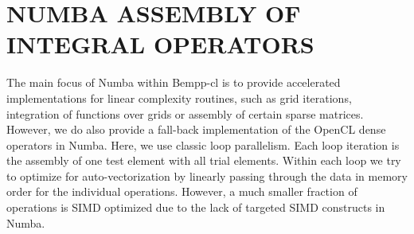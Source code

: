 \section{NUMBA ASSEMBLY OF INTEGRAL OPERATORS}

The main focus of Numba within Bempp-cl is to provide accelerated implementations for linear complexity routines, such as grid iterations, integration of functions over grids or assembly of certain sparse matrices. However, we do also provide a fall-back implementation of the OpenCL dense operators in Numba. Here, we use classic loop parallelism. Each loop iteration is the assembly of one test element with all trial elements. Within each loop we try to optimize for auto-vectorization by linearly passing through the data in memory order for the individual operations. However, a much smaller fraction of operations is SIMD optimized due to the lack of targeted SIMD constructs in Numba.


